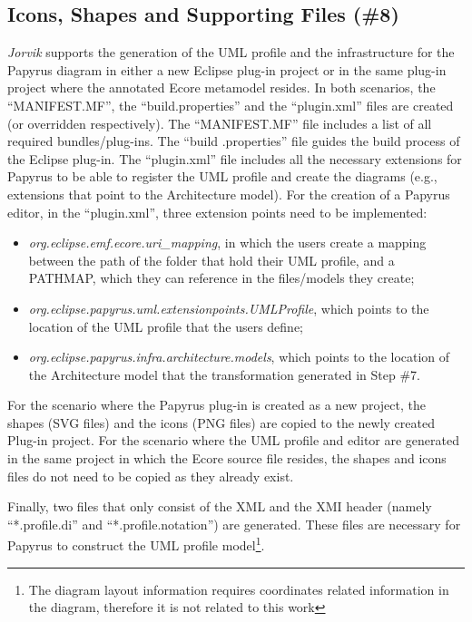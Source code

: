 \subsection{Icons, Shapes and Supporting Files (\#8)}
\label{sec:supportingFiles}
\textit{Jorvik} supports the generation of the UML profile and the infrastructure for the Papyrus diagram in either a new Eclipse plug-in project or in the same plug-in project where the annotated Ecore metamodel resides. 
In both scenarios, the ``MANIFEST.MF'', the ``build.properties'' and the ``plugin.xml'' files are created (or overridden respectively). 
The ``MANIFEST.MF'' file includes a list of all required bundles/plug-ins.
The ``build .properties'' file guides the build process of the Eclipse plug-in.
The ``plugin.xml'' file includes all the necessary extensions for Papyrus to be able to register the UML profile and create the diagrams (e.g., extensions that point to the Architecture model). 
For the creation of a Papyrus editor, in the ``plugin.xml'', three extension points need to be implemented:
\begin{itemize}
	\item \textit{org.eclipse.emf.ecore.uri\_mapping}, in which the users create a mapping between the path of the folder that hold their UML profile, and a PATHMAP, which they can reference in the files/models they create;
	\item \textit{org.eclipse.papyrus.uml.extensionpoints.UMLProfile}, which points to the location of the UML profile that the users define;
	\item \textit{org.eclipse.papyrus.infra.architecture.models}, which points to the location of the Architecture model that the transformation generated in Step \#7.
\end{itemize}

For the scenario where the Papyrus plug-in is created as a new project, the shapes (SVG files) and the icons (PNG files) are copied to the newly created Plug-in project. 
For the scenario where the UML profile and editor are generated in the same project in which the Ecore source file resides, the shapes and icons files do not need to be copied as they already exist.

Finally, two files that only consist of the XML and the XMI header (namely ``*.profile.di'' and ``*.profile.notation'') are generated. 
These files are necessary for Papyrus to construct the UML profile model\footnote{The diagram layout information requires coordinates related information in the diagram, therefore it is not related to this work}. 

